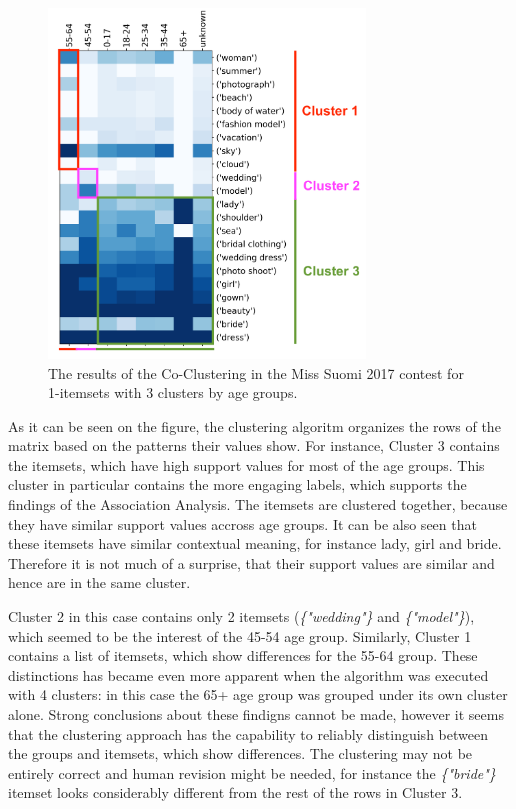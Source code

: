 \begin{figure}[h] 
    \begin{center}
        \includegraphics[width=0.75\textwidth]{Images/coclustering_miss-suomi-age_groups-1-itemsets-3_clusters_cropped.png}
        \caption{The results of the Co-Clustering in the Miss Suomi 2017 contest for 1-itemsets with 3 clusters by age groups.}
        \label{coclustering_miss-suomi-age_groups-1-itemsets}
    \end{center}
\end{figure}

As it can be seen on the figure, the clustering algoritm organizes the rows of the matrix based on the patterns their values show. For instance, Cluster 3 contains the itemsets, which have high support values for most of the age groups. This cluster in particular contains the more engaging labels, which supports the findings of the Association Analysis. The itemsets are clustered together, because they have similar support values accross age groups. It can be also seen that these itemsets have similar contextual meaning, for instance lady, girl and bride. Therefore it is not much of a surprise, that their support values are similar and hence are in the same cluster.

Cluster 2 in this case contains only 2 itemsets (\emph{\{"wedding"\}} and \emph{\{"model"\}}), which seemed to be the interest of the 45-54 age group. Similarly, Cluster 1 contains a list of itemsets, which show differences for the 55-64 group. These distinctions has became even more apparent when the algorithm was executed with 4 clusters: in this case the 65+ age group was grouped under its own cluster alone. Strong conclusions about these findigns cannot be made, however it seems that the clustering approach has the capability to reliably distinguish between the groups and itemsets, which show differences. The clustering may not be entirely correct and human revision might be needed, for instance the \emph{\{"bride"\}} itemset looks considerably different from the rest of the rows in Cluster 3.

